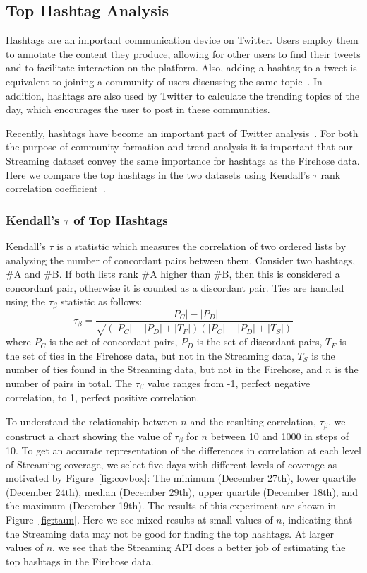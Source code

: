 \documentclass[letterpaper]{article}
\begin{document}
\subsection{Top Hashtag Analysis}
Hashtags are an important communication device on Twitter. Users employ them to annotate the content they produce, allowing for other users to find their tweets and to facilitate interaction on the platform. Also, adding a hashtag to a tweet is equivalent to joining a community of users discussing the same topic~\cite{Yang-etal12}. In addition, hashtags are also used by Twitter to calculate the trending topics of the day, which encourages the user to post in these communities. 

Recently, hashtags have become an important part of Twitter analysis~\cite{efron2010hashtag,tsur2012s,Recu12}. For both the purpose of community formation and trend analysis it is important that our Streaming dataset convey the same importance for hashtags as the Firehose data. Here we compare the top hashtags in the two datasets using Kendall's $\tau$ rank correlation coefficient~\cite{agre10}.
\subsubsection{Kendall's $\tau$ of Top Hashtags}
\label{sec:kthash}
Kendall's $\tau$ is a statistic which measures the correlation of two ordered lists by analyzing the number of concordant pairs between them. Consider two hashtags, \#A and \#B. If both lists rank \#A higher than \#B, then this is considered a concordant pair, otherwise it is counted as a discordant pair. Ties are handled using the $\tau_\beta$ statistic as follows:
\begin{equation}
\tau_\beta = \frac{|P_C| - |P_D|}{\sqrt{(|P_C| + |P_D| + |T_F|)(|P_C| + |P_D| + |T_S|)}}
\end{equation}
where $P_C$ is the set of concordant pairs, $P_D$ is the set of discordant pairs, $T_F$ is the set of ties in the Firehose data, but not in the Streaming data, $T_S$ is the number of ties found in the Streaming data, but not in the Firehose, and $n$ is the number of pairs in total. The $\tau_\beta$ value ranges from -1,  perfect negative correlation, to 1, perfect positive correlation.

To understand the relationship between $n$ and the resulting correlation, $\tau_\beta$, we construct a chart showing the value of $\tau_\beta$ for $n$ between 10 and 1000 in steps of 10. To get an accurate representation of the differences in correlation at each level of Streaming coverage, we select five days with different levels of coverage as motivated by Figure~\ref{fig:covbox}: The minimum (December 27th), lower quartile (December 24th), median (December 29th), upper quartile (December 18th), and the maximum (December 19th). The results of this experiment are shown in Figure~\ref{fig:taun}. Here we see mixed results at small values of $n$, indicating that the Streaming data may not be good for finding the top hashtags. At larger values of $n$, we see that the Streaming API does a better job of estimating the top hashtags in the Firehose data.
\end{document}
